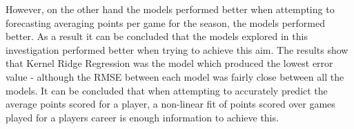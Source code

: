 \documentclass[a4paper,11pt,twoside]{article}
\begin{document}
However, on the other hand the models performed better when attempting to forecasting averaging points per game for the season, the models performed better. As a result it can be concluded that the models explored in this investigation performed better when trying to achieve this aim. The results show that Kernel Ridge Regression was the model which produced the lowest error value - although the RMSE between each model was fairly close between all the models. It can be concluded that when attempting to accurately predict the average points scored for a player, a non-linear fit of points scored over games played for a players career is enough information to achieve this.
\end{document}
